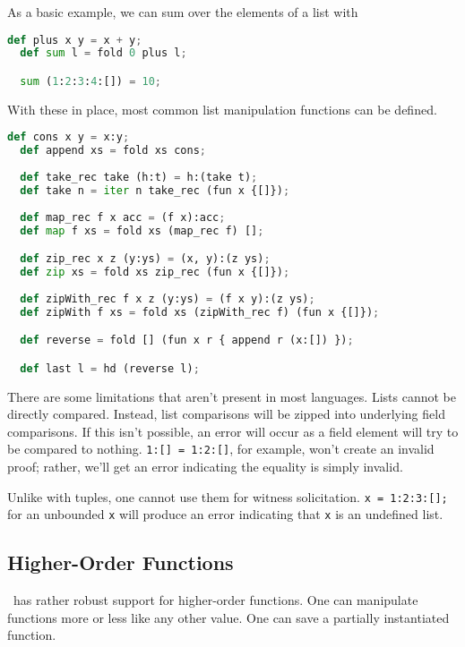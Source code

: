 As a basic example, we can sum over the elements of a list with

\begin{lstlisting}[language=Python]
  def plus x y = x + y;
  def sum l = fold 0 plus l;

  sum (1:2:3:4:[]) = 10;
\end{lstlisting}

With these in place, most common list manipulation functions can be defined.

\begin{lstlisting}[language=Python]
  def cons x y = x:y;
  def append xs = fold xs cons;
  
  def take_rec take (h:t) = h:(take t);
  def take n = iter n take_rec (fun x {[]});
  
  def map_rec f x acc = (f x):acc;
  def map f xs = fold xs (map_rec f) [];

  def zip_rec x z (y:ys) = (x, y):(z ys);
  def zip xs = fold xs zip_rec (fun x {[]});
  
  def zipWith_rec f x z (y:ys) = (f x y):(z ys);
  def zipWith f xs = fold xs (zipWith_rec f) (fun x {[]});

  def reverse = fold [] (fun x r { append r (x:[]) });

  def last l = hd (reverse l);
\end{lstlisting}

There are some limitations that aren't present in most languages. Lists cannot be directly compared. Instead, list comparisons will be zipped into underlying field comparisons. If this isn't possible, an error will occur as a field element will try to be compared to nothing. \lstinline{1:[] = 1:2:[]}, for example, won't create an invalid proof; rather, we'll get an error indicating the equality is simply invalid.

Unlike with tuples, one cannot use them for witness solicitation. \lstinline{x = 1:2:3:[];} for an unbounded \lstinline{x} will produce an error indicating that \lstinline{x} is an undefined list.


\subsection{Higher-Order Functions} \label{HOF}

\vampir\ has rather robust support for higher-order functions. One can manipulate functions more or less like any other value. One can save a partially instantiated function.

